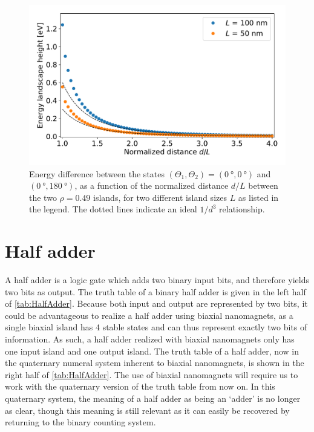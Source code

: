 \documentclass[11pt,a4paper,english,twoside]{article}
\begin{document}
\begin{figure}[hb!]
    \centering
    \includegraphics[width=0.63\columnwidth]{Figures/two_islands/EnergyBarrier/dist1-4L_r0.49_s100&50_4nm&2nm.pdf}
    \caption{Energy difference between the states $(\Theta_1, \Theta_2) = (\SI{0}{\degree}, \SI{0}{\degree})$ and $(\SI{0}{\degree}, \SI{180}{\degree})$, as a function of the normalized distance $d/L$ between the two $\rho=0.49$ islands, for two different island sizes $L$ as listed in the legend. The dotted lines indicate an ideal $1/d^3$ relationship.}
    \label{fig:two-islands_barrier}
\end{figure}

\cleardoublepage
\section{Half adder}
\label{par:halfadder}
A half adder is a logic gate which adds two binary input bits, and therefore yields two bits as output. The truth table of a binary half adder is given in the left half of \cref{tab:HalfAdder}. Because both input and output are represented by two bits, it could be advantageous to realize a half adder using biaxial nanomagnets, as a single biaxial island has 4 stable states and can thus represent exactly two bits of information. As such, a half adder realized with biaxial nanomagnets only has one input island and one output island. The truth table of a half adder, now in the quaternary numeral system inherent to biaxial nanomagnets, is shown in the right half of \cref{tab:HalfAdder}. The use of biaxial nanomagnets will require us to work with the quaternary version of the truth table from now on. In this quaternary system, the meaning of a half adder as being an `adder' is no longer as clear, though this meaning is still relevant as it can easily be recovered by returning to the binary counting system. \par
{}
\end{document}
